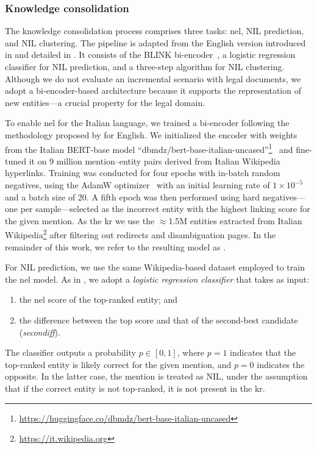 \subsubsection{Knowledge consolidation}
\label{sec:claw_consolidation}
The knowledge consolidation process comprises three tasks: \ac{nel}, NIL prediction, and NIL clustering.  
The pipeline is adapted from the English version introduced in \textcite{ijckg2022} and detailed in . It consists of the BLINK bi-encoder~\cite{blink}, a logistic regression classifier for NIL prediction, and a three-step algorithm for NIL clustering.  
Although we do not evaluate an incremental scenario with legal documents, we adopt a bi-encoder-based architecture because it supports the representation of new entities---a crucial property for the legal domain.

To enable \ac{nel} for the Italian language, we trained a bi-encoder following the methodology proposed by \textcite{blink} for English.  
We initialized the encoder with weights from the Italian BERT-base model ``dbmdz/bert-base-italian-uncased''\footnote{\url{https://huggingface.co/dbmdz/bert-base-italian-uncased}}~\cite{stefan_schweter_2020_4263142} and fine-tuned it on 9 million mention--entity pairs derived from Italian Wikipedia hyperlinks.  
Training was conducted for four epochs with in-batch random negatives, using the AdamW optimizer~\cite{loshchilov2018decoupled} with an initial learning rate of $1 \times 10^{-5}$ and a batch size of 20.  
A fifth epoch was then performed using hard negatives---one per sample---selected as the incorrect entity with the highest linking score for the given mention.  
As the \acl{kr} we use the $\approx$1.5M entities extracted from Italian Wikipedia\footnote{\url{https://it.wikipedia.org}} after filtering out redirects and disambiguation pages.  
In the remainder of this work, we refer to the resulting model as \blinkita.

For NIL prediction, we use the same Wikipedia-based dataset employed to train the \ac{nel} model.  
As in , we adopt a \textit{logistic regression classifier} that takes as input:
\begin{enumerate}
    \item the \ac{nel} score of the top-ranked entity; and
    \item the difference between the top score and that of the second-best candidate (\textit{secondiff}).
\end{enumerate}
The classifier outputs a probability $p \in [0,1]$, where $p = 1$ indicates that the top-ranked entity is likely correct for the given mention, and $p = 0$ indicates the opposite.  
In the latter case, the mention is treated as NIL, under the assumption that if the correct entity is not top-ranked, it is not present in the \ac{kr}.

